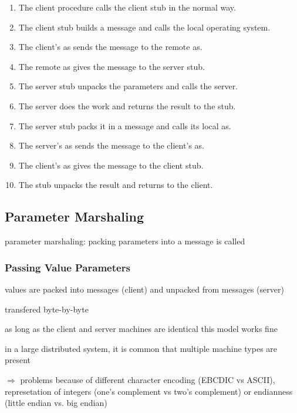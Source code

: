 \documentclass[ngerman,a4paper]{report}
\begin{document}
\begin{enumerate}
	\item The client procedure calls the client stub in the normal way.
	\item The client stub builds a message and calls the local operating system.
	\item The client's as sends the message to the remote as.
	\item The remote as gives the message to the server stub.
	\item The server stub unpacks the parameters and calls the server.
	\item The server does the work and returns the result to the stub.
	\item The server stub packs it in a message and calls its local as.
	\item The server's as sends the message to the client's as.
	\item The client's as gives the message to the client stub.
	\item The stub unpacks the result and returns to the client.
\end{enumerate}

\subsection*{Parameter Marshaling}

parameter marshaling: packing parameters into a message is called


\subsubsection*{Passing Value Parameters}

\begin{compactitem}
	\item values are packed into messages (client) and unpacked from messages (server)
	\item transfered byte-by-byte
	\item as long as the client and server machines are identical this model works fine
	\item in a large distributed system, it is common that multiple machine types are present
	\item $\Rightarrow$ problems because of different character encoding (EBCDIC vs ASCII), represetation of integers (one's complement vs two's complement) or endianness (little endian vs. big endian)
\end{compactitem}
\end{document}
